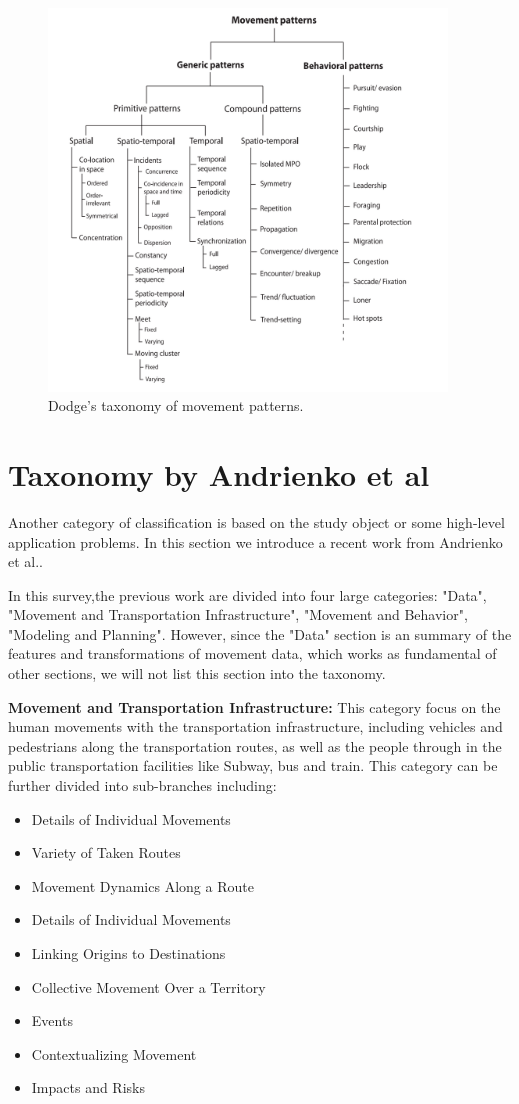\begin{figure}[!htb]
  \centering
  \includegraphics[width = 400px]{figures/dodgetax.png}
  \caption{Dodge's taxonomy of movement patterns.}
  \label{fig:dodgetax}
\end{figure}


\section{Taxonomy by Andrienko et al}
Another category of classification is based on the study object or some high-level application problems. In this section we introduce a recent work from Andrienko et al.\cite{andrienko2017visual}. 

In this survey,the previous work are divided into four large categories: "Data", "Movement and Transportation Infrastructure", "Movement and Behavior", "Modeling and Planning". However, since the "Data" section is an summary of the features and transformations of movement data, which works as fundamental of other sections, we will not list this section into the taxonomy. 

\textbf{Movement and Transportation Infrastructure:} This category focus on the human movements with the transportation infrastructure, including vehicles and pedestrians along the transportation routes, as well as the people through in the public transportation facilities like Subway, bus and train. This category can be further divided into sub-branches including: 

\begin{itemize}
	\item Details of Individual Movements
	\item Variety of Taken Routes
	\item Movement Dynamics Along a Route
	\item Details of Individual Movements
	\item Linking Origins to Destinations
	\item Collective Movement Over a Territory
	\item Events
	\item Contextualizing Movement
	\item Impacts and Risks
\end{itemize}

